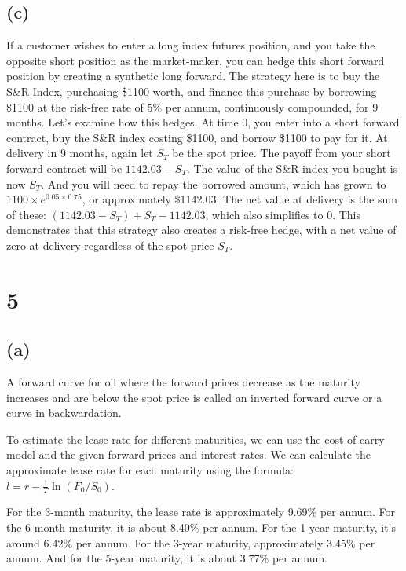 \subsection{(c)}\label{c}

If a customer wishes to enter a long index futures position, and you
take the opposite short position as the market-maker, you can hedge this
short forward position by creating a synthetic long forward. The
strategy here is to buy the S\&R Index, purchasing \$1100 worth, and
finance this purchase by borrowing \$1100 at the risk-free rate of 5\%
per annum, continuously compounded, for 9 months. Let's examine how this
hedges. At time 0, you enter into a short forward contract, buy the S\&R
index costing \$1100, and borrow \$1100 to pay for it. At delivery in 9
months, again let \(S_T\) be the spot price. The payoff from your short
forward contract will be \(1142.03 - S_T\). The value of the S\&R index
you bought is now \(S_T\). And you will need to repay the borrowed
amount, which has grown to \(1100 \times e^{0.05 \times 0.75}\), or
approximately \$1142.03. The net value at delivery is the sum of these:
\((1142.03 - S_T) + S_T - 1142.03\), which also simplifies to 0. This
demonstrates that this strategy also creates a risk-free hedge, with a
net value of zero at delivery regardless of the spot price \(S_T\).

    \section{5}\label{section}

\subsection{(a)}\label{a}

A forward curve for oil where the forward prices decrease as the
maturity increases and are below the spot price is called an inverted
forward curve or a curve in backwardation.

To estimate the lease rate for different maturities, we can use the cost
of carry model and the given forward prices and interest rates. We can
calculate the approximate lease rate for each maturity using the
formula: \(l = r - \frac{1}{T} \ln(F_0 / S_0)\).

For the 3-month maturity, the lease rate is approximately 9.69\% per
annum. For the 6-month maturity, it is about 8.40\% per annum. For the
1-year maturity, it's around 6.42\% per annum. For the 3-year maturity,
approximately 3.45\% per annum. And for the 5-year maturity, it is about
3.77\% per annum.

